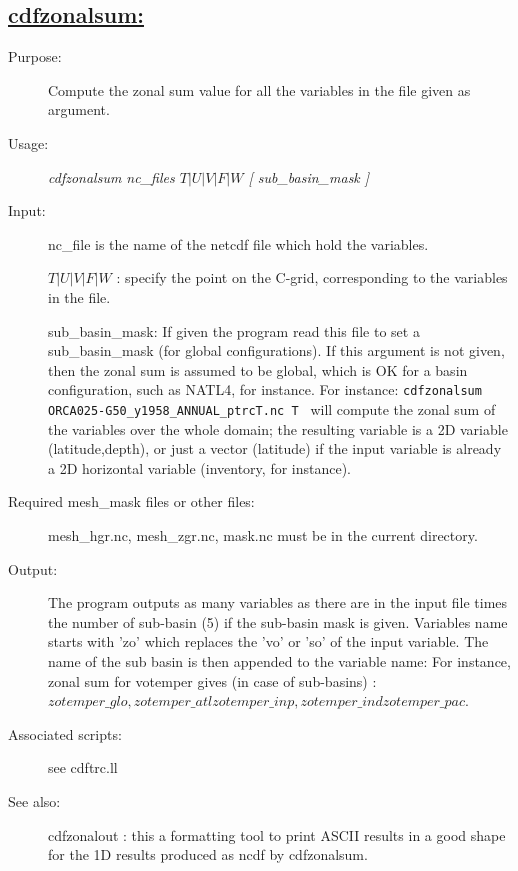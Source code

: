 \documentclass[a4paper,11pt]{article}
\begin{document}
\subsection*{\underline{cdfzonalsum:}}
\begin{description}
\item[Purpose:] Compute the zonal sum value for all the variables in the file given as argument.
\item[Usage:] {\em cdfzonalsum nc\_files   $T | U | V | F | W$ [ sub\_basin\_mask ]}
\item[Input:] nc\_file is the name of the netcdf file which hold the variables. 

$ T | U | V | F | W $ : specify the point on the C-grid, corresponding to the variables in the file.

 sub\_basin\_mask: If given the program read this file to set a sub\_basin\_mask (for global configurations). If this argument
is not given, then the zonal sum is assumed to be global, which is OK for a basin configuration, such as NATL4, for instance.
For instance: {\tt cdfzonalsum  ORCA025-G50\_y1958\_ANNUAL\_ptrcT.nc T } will compute the zonal sum
of the variables  over the whole domain; the resulting variable is a 2D variable (latitude,depth), or just
a vector (latitude) if the input variable is already a 2D horizontal variable (inventory, for instance).

\item[Required mesh\_mask files or other files:]  mesh\_hgr.nc, mesh\_zgr.nc, mask.nc must be in the current directory.
\item[Output:]  The program outputs as many variables as there are in the input file times the number of sub-basin (5) if the sub-basin
mask is given. Variables name starts with 'zo' which replaces the 'vo' or 'so' of the input variable. The name of the sub basin is then
appended to the variable name: For instance, zonal sum for votemper gives (in case of sub-basins) : $zotemper\_glo, zotemper\_atl
zotemper\_inp, zotemper\_ind zotemper\_pac$.
\item[Associated scripts:] {see cdftrc.ll}
\item[See also:] cdfzonalout : this a formatting tool to print ASCII results in a good shape for the 1D results produced as ncdf by cdfzonalsum.
\end{description}

\newpage
\end{document}
